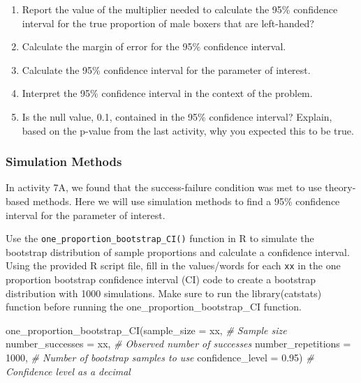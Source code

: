 \documentclass[
]{report}
\newenvironment{Shaded}{\begin{snugshade}}{\end{snugshade}}
\newcommand{\AttributeTok}[1]{\textcolor[rgb]{0.77,0.63,0.00}{#1}}
\newcommand{\CommentTok}[1]{\textcolor[rgb]{0.56,0.35,0.01}{\textit{#1}}}
\newcommand{\DecValTok}[1]{\textcolor[rgb]{0.00,0.00,0.81}{#1}}
\newcommand{\FloatTok}[1]{\textcolor[rgb]{0.00,0.00,0.81}{#1}}
\newcommand{\FunctionTok}[1]{\textcolor[rgb]{0.00,0.00,0.00}{#1}}
\newcommand{\NormalTok}[1]{#1}
\begin{document}
\begin{enumerate}
\def\labelenumi{\arabic{enumi}.}
\setcounter{enumi}{2}
\item
  Report the value of the multiplier needed to calculate the 95\% confidence interval for the true proportion of male boxers that are left-handed?
  \vspace{0.3in}
\item
  Calculate the margin of error for the 95\% confidence interval.
  \vspace{1in}
\item
  Calculate the 95\% confidence interval for the parameter of interest.
  \vspace{0.5in}
\item
  Interpret the 95\% confidence interval in the context of the problem.
  \vspace{1in}
\item
  Is the null value, 0.1, contained in the 95\% confidence interval? Explain, based on the p-value from the last activity, why you expected this to be true.
  \vspace{0.5in}
\end{enumerate}

\hypertarget{simulation-methods}{%
\subsubsection*{Simulation Methods}\label{simulation-methods}}

In activity 7A, we found that the success-failure condition was met to use theory-based methods. Here we will use simulation methods to find a 95\% confidence interval for the parameter of interest.

Use the \texttt{one\_proportion\_bootstrap\_CI()} function in R to simulate the bootstrap distribution of sample proportions and calculate a confidence interval. Using the provided R script file, fill in the values/words for each \texttt{xx} in the one proportion bootstrap confidence interval (CI) code to create a bootstrap distribution with 1000 simulations. Make sure to run the library(catstats) function before running the one\_proportion\_bootstrap\_CI function.

\begin{Shaded}
\begin{Highlighting}[]
\FunctionTok{one\_proportion\_bootstrap\_CI}\NormalTok{(}\AttributeTok{sample\_size =}\NormalTok{ xx, }\CommentTok{\# Sample size}
                    \AttributeTok{number\_successes =}\NormalTok{ xx, }\CommentTok{\# Observed number of successes}
                    \AttributeTok{number\_repetitions =} \DecValTok{1000}\NormalTok{, }\CommentTok{\# Number of bootstrap samples to use}
                    \AttributeTok{confidence\_level =} \FloatTok{0.95}\NormalTok{) }\CommentTok{\# Confidence level as a decimal}
\end{Highlighting}
\end{Shaded}
\end{document}
